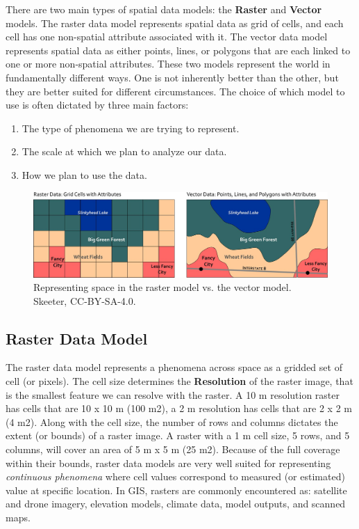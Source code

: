 \documentclass[
]{book}
\providecommand{\tightlist}{%
  \setlength{\itemsep}{0pt}\setlength{\parskip}{0pt}}
\begin{document}
There are two main types of spatial data models: the \textbf{Raster} and \textbf{Vector} models. The raster data model represents spatial data as grid of cells, and each cell has one non-spatial attribute associated with it. The vector data model represents spatial data as either points, lines, or polygons that are each linked to one or more non-spatial attributes. These two models represent the world in fundamentally different ways. One is not inherently better than the other, but they are better suited for different circumstances. The choice of which model to use is often dictated by three main factors:

\begin{enumerate}
\def\labelenumi{\arabic{enumi})}
\tightlist
\item
  The type of phenomena we are trying to represent.
\item
  The scale at which we plan to analyze our data.
\item
  How we plan to use the data.
\end{enumerate}

\begin{figure}
\includegraphics[width=0.75\linewidth]{images/03-vector-v-raster} \caption{Representing space in the raster model vs. the vector model. Skeeter, CC-BY-SA-4.0.}\label{fig:3-vector-v-raster}
\end{figure}

\hypertarget{raster-data-model}{%
\subsection{Raster Data Model}\label{raster-data-model}}

The raster data model represents a phenomena across space as a gridded set of cell (or pixels). The cell size determines the \textbf{Resolution} of the raster image, that is the smallest feature we can resolve with the raster. A 10 m resolution raster has cells that are 10 x 10 m (100 m2), a 2 m resolution has cells that are 2 x 2 m (4 m2). Along with the cell size, the number of rows and columns dictates the extent (or bounds) of a raster image. A raster with a 1 m cell size, 5 rows, and 5 columns, will cover an area of 5 m x 5 m (25 m2). Because of the full coverage within their bounds, raster data models are very well suited for representing \emph{continuous phenomena} where cell values correspond to measured (or estimated) value at specific location. In GIS, rasters are commonly encountered as: satellite and drone imagery, elevation models, climate data, model outputs, and scanned maps.
\end{document}
